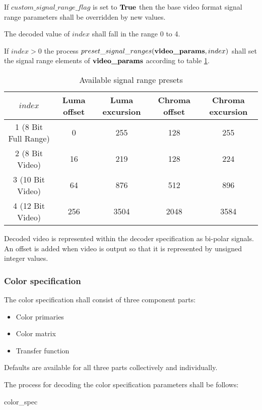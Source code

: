 If $custom\_signal\_range\_flag$ is set to $\text{\bf{True}}$ then the base video format
signal range parameters shall be overridden by new values.

The decoded value of $index$ shall fall in the range 0 to 4.

If $index>0$ the process $preset\_signal\_ranges(\textbf{video\_params},index)$ 
shall set the signal range elements of $\textbf{video\_params}$ according to table 
\ref{table:signalrangevalues}.

\begin{table}[!ht]
\centering
\begin{tabular}{|c|c|c|c|c|}
\hline
\rowcolor[gray]{0.75}$index$ & Luma offset & Luma excursion & Chroma offset & Chroma excursion\\
\hline
1 (8 Bit Full Range) & 0 & 255 & 128 & 255\\
\hline
2 (8 Bit Video) & 16 & 219 & 128 & 224\\
\hline
3 (10 Bit Video) & 64 & 876 & 512 &  896\\
\hline
4 (12 Bit Video) & 256 & 3504 & 2048 & 3584\\
\hline
\end{tabular}
\caption{Available signal range presets}\label{table:signalrangevalues}
\end{table}

\begin{informative}
Decoded video is represented within the decoder specification as bi-polar 
signals. An offset is added when video is output so that it is represented by unsigned 
integer values.
\end{informative}

\subsubsection{Color specification}
\label{colorspec}

The color specification shall consist of three component parts:
\begin{itemize}
\item Color primaries
\item Color matrix 
\item Transfer function
\end{itemize}

Defaults are available for all three parts collectively and individually.

The process for decoding the color specification parameters shall be follows: 

\begin{pseudo}{color\_spec}{\VideoParams}
    \bsEND
\bsEND
\end{pseudo}

